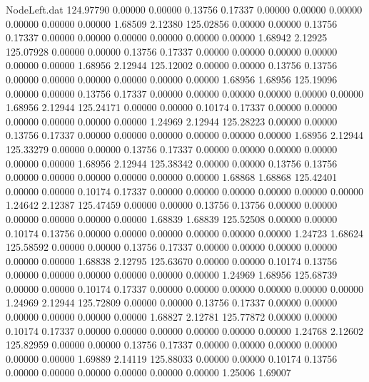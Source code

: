 \begin{filecontents}{NodeLeft.dat}
 124.97790    0.00000    0.00000     0.13756    0.17337    0.00000    0.00000    0.00000    0.00000    0.00000    0.00000    1.68509    2.12380
 125.02856    0.00000    0.00000     0.13756    0.17337    0.00000    0.00000    0.00000    0.00000    0.00000    0.00000    1.68942    2.12925
 125.07928    0.00000    0.00000     0.13756    0.17337    0.00000    0.00000    0.00000    0.00000    0.00000    0.00000    1.68956    2.12944
 125.12002    0.00000    0.00000     0.13756    0.13756    0.00000    0.00000    0.00000    0.00000    0.00000    0.00000    1.68956    1.68956
 125.19096    0.00000    0.00000     0.13756    0.17337    0.00000    0.00000    0.00000    0.00000    0.00000    0.00000    1.68956    2.12944
 125.24171    0.00000    0.00000     0.10174    0.17337    0.00000    0.00000    0.00000    0.00000    0.00000    0.00000    1.24969    2.12944
 125.28223    0.00000    0.00000     0.13756    0.17337    0.00000    0.00000    0.00000    0.00000    0.00000    0.00000    1.68956    2.12944
 125.33279    0.00000    0.00000     0.13756    0.17337    0.00000    0.00000    0.00000    0.00000    0.00000    0.00000    1.68956    2.12944
 125.38342    0.00000    0.00000     0.13756    0.13756    0.00000    0.00000    0.00000    0.00000    0.00000    0.00000    1.68868    1.68868
 125.42401    0.00000    0.00000     0.10174    0.17337    0.00000    0.00000    0.00000    0.00000    0.00000    0.00000    1.24642    2.12387
 125.47459    0.00000    0.00000     0.13756    0.13756    0.00000    0.00000    0.00000    0.00000    0.00000    0.00000    1.68839    1.68839
 125.52508    0.00000    0.00000     0.10174    0.13756    0.00000    0.00000    0.00000    0.00000    0.00000    0.00000    1.24723    1.68624
 125.58592    0.00000    0.00000     0.13756    0.17337    0.00000    0.00000    0.00000    0.00000    0.00000    0.00000    1.68838    2.12795
 125.63670    0.00000    0.00000     0.10174    0.13756    0.00000    0.00000    0.00000    0.00000    0.00000    0.00000    1.24969    1.68956
 125.68739    0.00000    0.00000     0.10174    0.17337    0.00000    0.00000    0.00000    0.00000    0.00000    0.00000    1.24969    2.12944
 125.72809    0.00000    0.00000     0.13756    0.17337    0.00000    0.00000    0.00000    0.00000    0.00000    0.00000    1.68827    2.12781
 125.77872    0.00000    0.00000     0.10174    0.17337    0.00000    0.00000    0.00000    0.00000    0.00000    0.00000    1.24768    2.12602
 125.82959    0.00000    0.00000     0.13756    0.17337    0.00000    0.00000    0.00000    0.00000    0.00000    0.00000    1.69889    2.14119
 125.88033    0.00000    0.00000     0.10174    0.13756    0.00000    0.00000    0.00000    0.00000    0.00000    0.00000    1.25006    1.69007

\end{filecontents}
